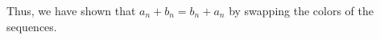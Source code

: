 \documentclass[preview]{standalone}
\begin{document}
\begin{center}
Thus, we have shown that $a_n + b_n = b_n + a_n$ by swapping the colors of the sequences.
\end{center}
\end{document}
